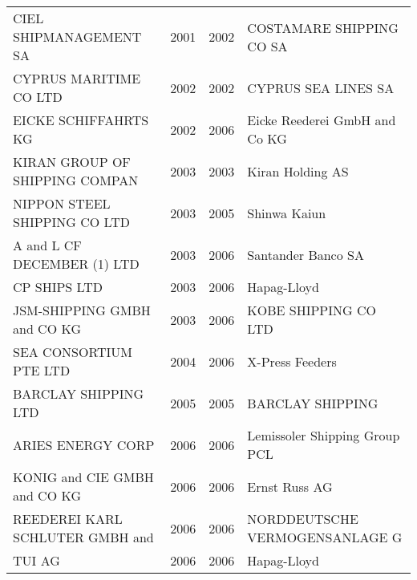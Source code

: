 \begin{tabular}[t]{lrrl}
CIEL SHIPMANAGEMENT SA & 2001 & 2002 & COSTAMARE SHIPPING CO SA\\
CYPRUS MARITIME CO LTD & 2002 & 2002 & CYPRUS SEA LINES SA\\
EICKE SCHIFFAHRTS KG & 2002 & 2006 & Eicke Reederei GmbH  and  Co KG\\
KIRAN GROUP OF SHIPPING COMPAN & 2003 & 2003 & Kiran Holding AS\\
NIPPON STEEL SHIPPING CO LTD & 2003 & 2005 & Shinwa Kaiun\\
A and L CF DECEMBER (1) LTD & 2003 & 2006 & Santander Banco SA\\
CP SHIPS LTD & 2003 & 2006 & Hapag-Lloyd\\
JSM-SHIPPING GMBH and CO KG & 2003 & 2006 & KOBE SHIPPING CO LTD\\
SEA CONSORTIUM PTE LTD & 2004 & 2006 & X-Press Feeders\\
BARCLAY SHIPPING LTD & 2005 & 2005 & BARCLAY SHIPPING\\
ARIES ENERGY CORP & 2006 & 2006 & Lemissoler Shipping Group PCL\\
KONIG and CIE GMBH and CO KG & 2006 & 2006 & Ernst Russ AG\\
REEDEREI KARL SCHLUTER GMBH  and & 2006 & 2006 & NORDDEUTSCHE VERMOGENSANLAGE G\\
TUI AG & 2006 & 2006 & Hapag-Lloyd\\
\bottomrule
\end{tabular}
